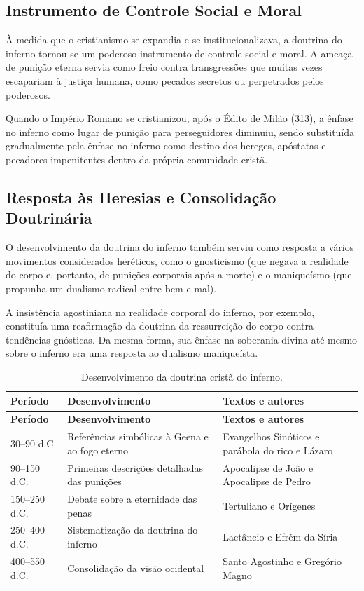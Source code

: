 \subsection{Instrumento de Controle Social e Moral}

À medida que o cristianismo se expandia e se institucionalizava, a doutrina do inferno tornou-se um poderoso instrumento de controle social e moral. A ameaça de punição eterna servia como freio contra transgressões que muitas vezes escapariam à justiça humana, como pecados secretos ou perpetrados pelos poderosos.

Quando o Império Romano se cristianizou, após o Édito de Milão (313), a ênfase no inferno como lugar de punição para perseguidores diminuiu, sendo substituída gradualmente pela ênfase no inferno como destino dos hereges, apóstatas e pecadores impenitentes dentro da própria comunidade cristã.

\subsection{Resposta às Heresias e Consolidação Doutrinária}

O desenvolvimento da doutrina do inferno também serviu como resposta a vários movimentos considerados heréticos, como o gnosticismo (que negava a realidade do corpo e, portanto, de punições corporais após a morte) e o maniqueísmo (que propunha um dualismo radical entre bem e mal).

A insistência agostiniana na realidade corporal do inferno, por exemplo, constituía uma reafirmação da doutrina da ressurreição do corpo contra tendências gnósticas. Da mesma forma, sua ênfase na soberania divina até mesmo sobre o inferno era uma resposta ao dualismo maniqueísta.

\begin{longtable}{@{}p{2.5cm}p{5.4cm}p{6.0cm}@{}}
\caption{Desenvolvimento da doutrina cristã do inferno.}\\
\toprule
\textbf{Período} & \textbf{Desenvolvimento} & \textbf{Textos e autores} \\
\midrule
\endfirsthead
\toprule
\textbf{Período} & \textbf{Desenvolvimento} & \textbf{Textos e autores} \\
\midrule
\endhead
30--90 d.C. & Referências simbólicas à Geena e ao fogo eterno & Evangelhos Sinóticos e parábola do rico e Lázaro \\
90--150 d.C. & Primeiras descrições detalhadas das punições & Apocalipse de João e Apocalipse de Pedro \\
150--250 d.C. & Debate sobre a eternidade das penas & Tertuliano e Orígenes \\
250--400 d.C. & Sistematização da doutrina do inferno & Lactâncio e Efrém da Síria \\
400--550 d.C. & Consolidação da visão ocidental & Santo Agostinho e Gregório Magno \\
\bottomrule
\end{longtable}

